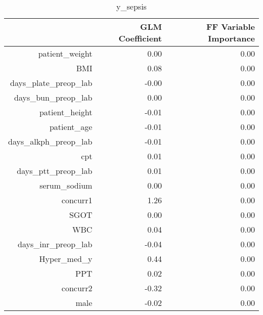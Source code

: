 \begin{table}[ht]
\centering
\begin{tabular}{rrr}
  \hline
 & GLM Coefficient & FF Variable Importance \\ 
  \hline
patient\_weight & 0.00 & 0.00 \\ 
  BMI & 0.08 & 0.00 \\ 
  days\_plate\_preop\_lab & -0.00 & 0.00 \\ 
  days\_bun\_preop\_lab & 0.00 & 0.00 \\ 
  patient\_height & -0.01 & 0.00 \\ 
  patient\_age & -0.01 & 0.00 \\ 
  days\_alkph\_preop\_lab & -0.01 & 0.00 \\ 
  cpt & 0.01 & 0.00 \\ 
  days\_ptt\_preop\_lab & 0.01 & 0.00 \\ 
  serum\_sodium & 0.00 & 0.00 \\ 
  concurr1 & 1.26 & 0.00 \\ 
  SGOT & 0.00 & 0.00 \\ 
  WBC & 0.04 & 0.00 \\ 
  days\_inr\_preop\_lab & -0.04 & 0.00 \\ 
  Hyper\_med\_y & 0.44 & 0.00 \\ 
  PPT & 0.02 & 0.00 \\ 
  concurr2 & -0.32 & 0.00 \\ 
  male & -0.02 & 0.00 \\ 
   \hline
\end{tabular}
\caption{y_sepsis} 
\end{table}

